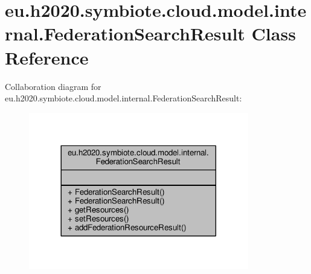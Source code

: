 \hypertarget{classeu_1_1h2020_1_1symbiote_1_1cloud_1_1model_1_1internal_1_1FederationSearchResult}{}\section{eu.\+h2020.\+symbiote.\+cloud.\+model.\+internal.\+Federation\+Search\+Result Class Reference}
\label{classeu_1_1h2020_1_1symbiote_1_1cloud_1_1model_1_1internal_1_1FederationSearchResult}


Collaboration diagram for eu.\+h2020.\+symbiote.\+cloud.\+model.\+internal.\+Federation\+Search\+Result\+:\nopagebreak
\begin{figure}[H]
\begin{center}
\leavevmode
\includegraphics[width=272pt]{classeu_1_1h2020_1_1symbiote_1_1cloud_1_1model_1_1internal_1_1FederationSearchResult__coll__graph}
\end{center}
\end{figure}

